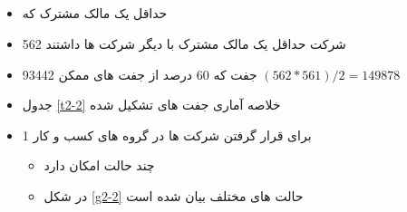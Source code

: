 \documentclass[12pt, a4paper]{article}
\begin{document}
\subsection{ }
\begin{itemize}
	\item 
	حداقل یک مالک مشترک که 
		\item 
		562 شرکت حداقل یک مالک مشترک با دیگر شرکت ها داشتند
	\item 
	93442 جفت که 60 درصد از جفت های ممکن
	$ (562*561)/2 = 149878$

	\item 
	جدول
	 \ref{t2-2}
	 خلاصه آماری جفت های تشکیل شده
	\item 1
	برای قرار گرفتن شرکت ها در گروه های کسب و کار 
	\begin{itemize}
		\item
		 چند حالت امکان دارد 
		 \item
		 در شکل 
		 \ref{g2-2}
		 حالت های مختلف بیان شده است
	\end{itemize}
	
\end{itemize}

 
\begin{LTR}
\end{LTR}
\end{document}
